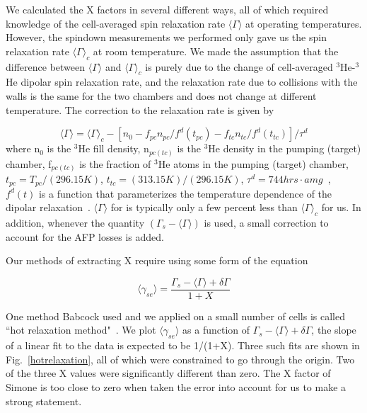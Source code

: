 We calculated the X factors in several different ways, all of which required knowledge of the cell-averaged spin relaxation rate $\langle \Gamma\rangle$ at operating temperatures. However, the spindown measurements we performed only gave us the spin relaxation rate $\langle \Gamma\rangle_{c}$ at room temperature. We made the assumption that the difference between $\langle \Gamma\rangle$ and $\langle \Gamma\rangle_{c}$ is purely due to the change of cell-averaged $^{3}$He-$^{3}$He dipolar spin relaxation rate, and the relaxation rate due to collisions with the walls is the same for the two chambers and does not change at different temperature. The correction to the relaxation rate is given by

\begin{equation}
\langle \Gamma\rangle=\langle \Gamma\rangle_{c}-[n_{0}-f_{pc}n_{pc}/f^{d}(t_{pc})- f_{tc}n_{tc}/f^{d}(t_{tc})]/\tau^{d}
\end{equation}
where n$_{0}$ is the $^{3}$He fill density, n$_{pc(tc)}$ is the $^{3}$He density in the pumping (target) chamber, f$_{pc(tc)}$ is the fraction of $^{3}$He atoms in the pumping (target) chamber, $t_{pc}=T_{pc}/(296.15 K)$, $t_{tc}=(313.15 K)/(296.15 K)$, $\tau^{d}=744 hrs\cdot amg$~\cite{PhysRevA.48.4411}, $f^{d}(t)$ is a function that parameterizes the temperature dependence of the dipolar relaxation~\cite{JaideepThesis}. $\langle \Gamma\rangle$ for is typically only a few percent less than $\langle \Gamma\rangle_{c}$ for us. In addition, whenever the quantity $(\Gamma_{s}-\langle \Gamma\rangle)$ is used, a small correction to account for the AFP losses is added.

Our methods of extracting X require using some form of the equation

\begin{equation}\label{gammase}
\langle \gamma_{se}\rangle=\frac{\Gamma_{s}-\langle \Gamma\rangle+\delta\Gamma}{1+X}
\end{equation}

One method Babcock used and we applied on a small number of cells is called ``hot relaxation method"~\cite{PhysRevLett.96.083003}. We plot $\langle \gamma_{se}\rangle$ as a function of $\Gamma_s - \langle\Gamma\rangle + \delta\Gamma$, the slope of a linear fit to the data is expected to be 1/(1+X). Three such fits are shown in Fig.~\ref{hotrelaxation}, all of which were constrained to go through the origin. Two of the three X values were significantly different than zero. The X factor of Simone is too close to zero when taken the error into account for us to make a strong statement.


